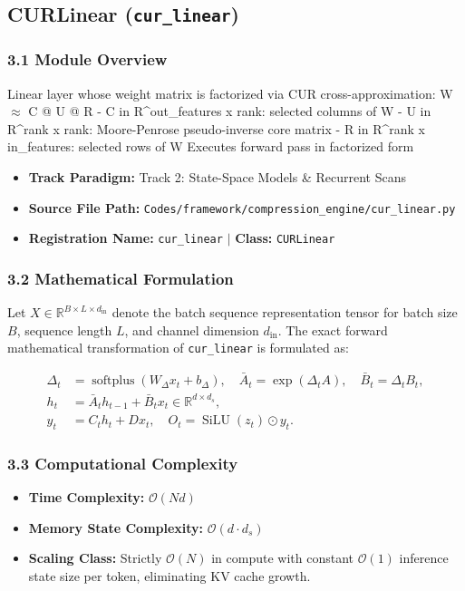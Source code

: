 \subsection{CURLinear (\texttt{cur\_linear})}
\label{sec:app_module_cur\_linear}

\subsubsection*{3.1 Module Overview}
Linear layer whose weight matrix is factorized via CUR cross-approximation: W $\approx$ C @ U @ R - C in R^{out\_features x rank}: selected columns of W - U in R^{rank x rank}: Moore-Penrose pseudo-inverse core matrix - R in R^{rank x in\_features}: selected rows of W  Executes forward pass in factorized form
\begin{itemize}
    \item \textbf{Track Paradigm:} Track 2: State-Space Models & Recurrent Scans
    \item \textbf{Source File Path:} \texttt{Codes/framework/compression\_engine/cur\_linear.py}
    \item \textbf{Registration Name:} \texttt{cur\_linear} $\mid$ \textbf{Class:} \texttt{CURLinear}
\end{itemize}

\subsubsection*{3.2 Mathematical Formulation}
Let $X \in \mathbb{R}^{B \times L \times d_{\text{in}}}$ denote the batch sequence representation tensor for batch size $B$, sequence length $L$, and channel dimension $d_{\text{in}}$. The exact forward mathematical transformation of \texttt{cur\_linear} is formulated as:

\begin{align}
\Delta_t &= \operatorname{softplus}(W_\Delta x_t + b_\Delta), \quad \bar{A}_t = \exp(\Delta_t A), \quad \bar{B}_t = \Delta_t B_t, \\
h_t &= \bar{A}_t h_{t-1} + \bar{B}_t x_t \in \mathbb{R}^{d \times d_s}, \\
y_t &= C_t h_t + D x_t, \quad O_t = \operatorname{SiLU}(z_t) \odot y_t.
\end{align}


\subsubsection*{3.3 Computational Complexity}
\begin{itemize}
    \item \textbf{Time Complexity:} $\mathcal{O}(N d)$
    \item \textbf{Memory State Complexity:} $\mathcal{O}(d \cdot d_s)$
    \item \textbf{Scaling Class:} Strictly $\mathcal{O}(N)$ in compute with constant $\mathcal{O}(1)$ inference state size per token, eliminating KV cache growth.
\end{itemize}

